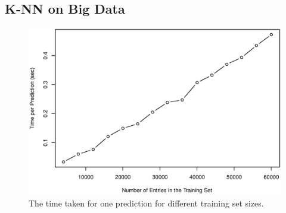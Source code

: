 \subsection{K-NN on Big Data}



\begin{figure}[H]
\centering
\includegraphics[width = 16cm]{graphics/graph_timeVSppl}
\caption{The time taken for one prediction for different training set sizes.}
\label{fig:predictionTimeVStrainSize}
\end{figure}